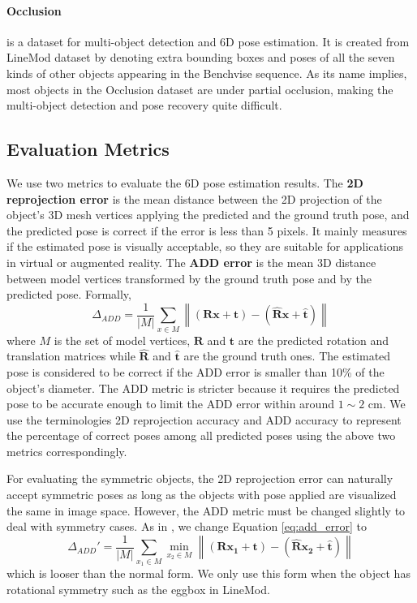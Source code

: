 \documentclass[10pt,twocolumn,letterpaper]{article}
\begin{document}
\paragraph{Occlusion \cite{10.1007/978-3-319-10605-2_35}}
is a dataset for multi-object detection and 6D pose estimation. It is created from LineMod dataset by denoting extra bounding boxes and poses of all the seven kinds of other objects appearing in the Benchvise sequence. As its name implies, most objects in the Occlusion dataset are under partial occlusion, making the multi-object detection and pose recovery quite difficult.

\subsection{Evaluation Metrics}
We use two metrics to evaluate the 6D pose estimation results. The \textbf{2D reprojection error} \cite{7780735} is the mean distance between the 2D projection of the object's 3D mesh vertices applying the predicted and the ground truth pose, and the predicted pose is correct if the error is less than 5 pixels. It mainly measures if the estimated pose is visually acceptable, so they are suitable for applications in virtual or augmented reality. The \textbf{ADD error} \cite{Hinterstoisser:2012:MBT:2481913.2481959} is the mean 3D distance between model vertices transformed by the ground truth pose and by the predicted pose. Formally,
\begin{equation}
\label{eq:add_error}
    \Delta_{ADD} = \frac { 1 } { |M | } \sum _ { x \in  M } \left\| ( \mathbf { R } \mathbf { x } + \mathbf { t } ) - ( \hat { \mathbf { R } }  \mathbf {x} + \hat { \mathbf { t } }) \right\|
\end{equation}
where $M$ is the set of model vertices, $\mathbf{R}$ and $\mathbf{t}$ are the predicted rotation and translation matrices while $\hat { \mathbf { R }}$ and $\hat { \mathbf { t } }$ are the ground truth ones. The estimated pose is considered to be correct if the ADD error is smaller than 10\% of the object's diameter. The ADD metric is stricter because it requires the predicted pose to be accurate enough to limit the ADD error within around $1 \sim 2$ cm. We use the terminologies 2D reprojection accuracy and ADD accuracy to represent the percentage of correct poses among all predicted poses using the above two metrics correspondingly.

 For evaluating the symmetric objects, the 2D reprojection error can naturally accept symmetric poses as long as the objects with pose applied are visualized the same in image space. However, the ADD metric must be changed slightly to deal with symmetry cases. As in \cite{7780735,Hinterstoisser:2012:MBT:2481913.2481959,tekin18}, we change Equation \ref{eq:add_error}  to
\begin{equation}
\label{eq:sym_add_error}
    \Delta_{ADD}' = \frac { 1 } { |M | } \sum _ { x_1 \in  M } \min_{ x_2 \in M}\left\| ( \mathbf { R } \mathbf { x_1 } + \mathbf { t } ) - ( \hat { \mathbf { R } }  \mathbf {x_2} + \hat { \mathbf { t } }) \right\|
\end{equation}
which is looser than the normal form. We only use this form when the object has rotational symmetry such as the eggbox in LineMod.
\end{document}

